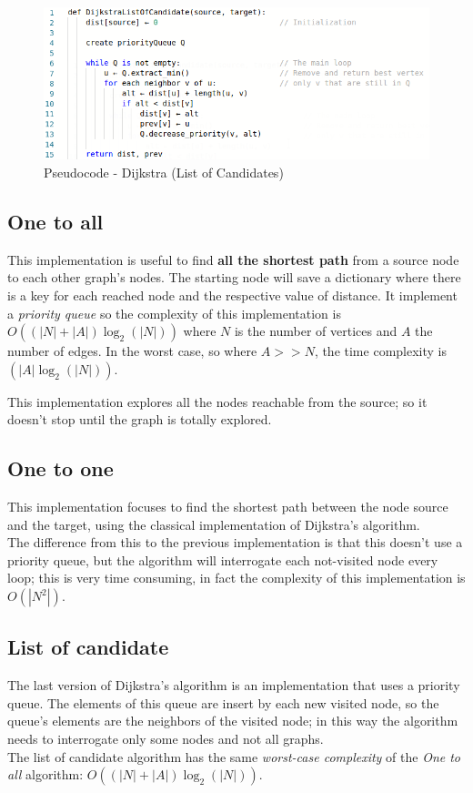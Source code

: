 \documentclass[a4paper,12pt]{report}
\begin{document}
\begin{figure}[h]
	\centering
	\includegraphics[width=\linewidth]{img/dijkstraLoC.png}
	\caption{Pseudocode - Dijkstra (List of Candidates)}
	\label{fig:dijkstraLoC}
\end{figure}

\subsection{One to all}
This implementation is useful to find \textbf{all the shortest path} from a source node to each other graph's nodes. The starting node will save a dictionary where there is a key for each reached node and the respective value of distance.
It implement a \textit{priority queue} so the complexity of this implementation is $O((|N|+|A|)\log_2(|N|))$ where $N$ is the number of vertices and $A$ the number of edges. In the worst case, so where $A>>N$, the time complexity is $(|A|\log_2(|N|))$.

This implementation explores all the nodes reachable from the source; so it doesn't stop until the graph is totally explored.

\subsection{One to one}
This implementation focuses to find the shortest path between the node source and the target, using the classical implementation of Dijkstra's algorithm.\\
The difference from this to the previous implementation is that this doesn't use a priority queue, but the algorithm will interrogate each not-visited node every loop; this is very time consuming, in fact the complexity of this implementation is $O(|N^2|)$.

\subsection{List of candidate}
The last version of Dijkstra's algorithm is an implementation that uses a priority queue. The elements of this queue are insert by each new visited node, so the queue's elements are the neighbors of the visited node; in this way the algorithm needs to interrogate only some nodes and not all graphs.\\
The list of candidate algorithm has the same \textit{worst-case complexity} of the \textit{One to all} algorithm: $O((|N|+|A|)\log_2(|N|))$.
\end{document}
